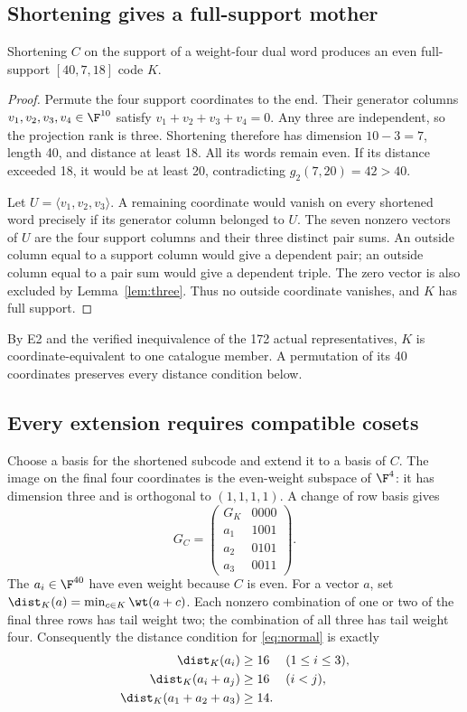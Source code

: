 \subsection{Shortening gives a full-support mother}
\begin{lemma}\label{lem:mother}
Shortening $C$ on the support of a weight-four dual word produces an even full-support $[40,7,18]$ code $K$.
\end{lemma}
\begin{proof}
Permute the four support coordinates to the end. Their generator columns $v_1,v_2,v_3,v_4\in\F^{10}$ satisfy $v_1+v_2+v_3+v_4=0$. Any three are independent, so the projection rank is three. Shortening therefore has dimension $10-3=7$, length 40, and distance at least 18. All its words remain even. If its distance exceeded 18, it would be at least 20, contradicting $g_2(7,20)=42>40$.

Let $U=\langle v_1,v_2,v_3\rangle$. A remaining coordinate would vanish on every shortened word precisely if its generator column belonged to $U$. The seven nonzero vectors of $U$ are the four support columns and their three distinct pair sums. An outside column equal to a support column would give a dependent pair; an outside column equal to a pair sum would give a dependent triple. The zero vector is also excluded by Lemma~\ref{lem:three}. Thus no outside coordinate vanishes, and $K$ has full support.
\end{proof}
By E2 and the verified inequivalence of the 172 actual representatives, $K$ is coordinate-equivalent to one catalogue member. A permutation of its 40 coordinates preserves every distance condition below.

\subsection{Every extension requires compatible cosets}
Choose a basis for the shortened subcode and extend it to a basis of $C$. The image on the final four coordinates is the even-weight subspace of $\F^4$: it has dimension three and is orthogonal to $(1,1,1,1)$. A change of row basis gives
\begin{equation}\label{eq:normal}
 G_C=\begin{pmatrix}
 G_K&0000\\
 a_1&1001\\
 a_2&0101\\
 a_3&0011
 \end{pmatrix}.
\end{equation}
The $a_i\in\F^{40}$ have even weight because $C$ is even. For a vector $a$, set $\dist_K(a)=\min_{c\in K}\wt(a+c)$. Each nonzero combination of one or two of the final three rows has tail weight two; the combination of all three has tail weight four. Consequently the distance condition for \eqref{eq:normal} is exactly
\begin{align}
 \dist_K(a_i)&\ge16 &&(1\le i\le3),\notag\\
 \dist_K(a_i+a_j)&\ge16 &&(i<j),\label{eq:extension}\\
 \dist_K(a_1+a_2+a_3)&\ge14.\notag
\end{align}

